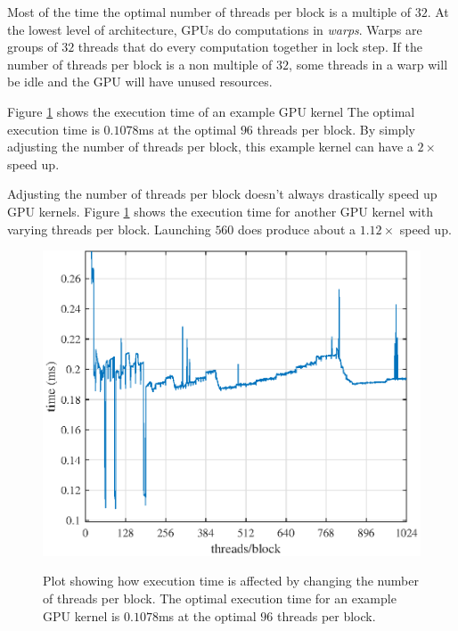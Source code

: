 Most of the time the optimal number of threads per block is a multiple of $32$. 
At the lowest level of architecture, GPUs do computations in \textit{warps}.
Warps are groups of $32$ threads that do every computation together in lock step.
If the number of threads per block is a non multiple of $32$, some threads in a warp will be idle and the GPU will have unused resources.


Figure \ref{fig:ConvGPU_shared_12672_186taps} shows the execution time of an example GPU kernel
The optimal execution time is $0.1078$ms at the optimal $96$ threads per block.
By simply adjusting the number of threads per block, this example kernel can have a $2\times$ speed up.

Adjusting the number of threads per block doesn't always drastically speed up GPU kernels.
Figure \ref{fig:ConvGPU_shared_12672_186taps} shows the execution time for another GPU kernel with varying threads per block.
Launching $560$ does produce about a $1.12\times$ speed up.
\begin{figure}
	\centering\includegraphics[width=5in]{figures/gpu_intro/ConvGPU_shared_12672_186taps.eps}
	\label{fig:ConvGPU_shared_12672_186taps}
	\caption{Plot showing how execution time is affected by changing the number of threads per block.
	The optimal execution time for an example GPU kernel is $0.1078$ms at the optimal $96$ threads per block.}
\end{figure}
